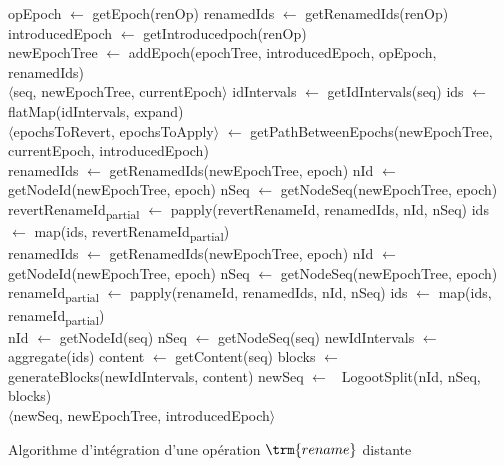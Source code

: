\begin{algorithm}[!ht]
  \footnotesize
  \begin{algorithmic}[5]
          \State opEpoch $\gets$ getEpoch(renOp)
          \State renamedIds $\gets$ getRenamedIds(renOp)
          \State introducedEpoch $\gets$ getIntroducedpoch(renOp)
          \\
          \State newEpochTree $\gets$ addEpoch(epochTree, introducedEpoch, opEpoch, renamedIds) \label{alg:renameRemote-addEpoch}
          \\
            \State \Return $\langle$seq, newEpochTree, currentEpoch$\rangle$ \label{alg:renameRemote-return-1}
          \Else
            \State idIntervals $\gets$ getIdIntervals(seq) \label{alg:renameRemote-getIdIntervals}
            \State ids $\gets$ flatMap(idIntervals, expand) \label{alg:renameRemote-getIds}
            \\
            \State $\langle$epochsToRevert, epochsToApply$\rangle$ $\gets$ getPathBetweenEpochs(newEpochTree, currentEpoch, introducedEpoch) \label{alg:renameRemote-get-path}
            \\
             \label{alg:renameRemote-rename-1}
              \State renamedIds $\gets$ getRenamedIds(newEpochTree, epoch)
              \State nId $\gets$ getNodeId(newEpochTree, epoch)
              \State nSeq $\gets$ getNodeSeq(newEpochTree, epoch)
              \State revertRenameId\textsubscript{partial} $\gets$ papply(revertRenameId, renamedIds, nId, nSeq)
              \State ids $\gets$ map(ids, revertRenameId\textsubscript{partial})
            \EndFor
            \\
              \State renamedIds $\gets$ getRenamedIds(newEpochTree, epoch)
              \State nId $\gets$ getNodeId(newEpochTree, epoch)
              \State nSeq $\gets$ getNodeSeq(newEpochTree, epoch)
              \State renameId\textsubscript{partial} $\gets$ papply(renameId, renamedIds, nId, nSeq)
              \State ids $\gets$ map(ids, renameId\textsubscript{partial})
            \EndFor \label{alg:renameRemote-rename-2}
            \\
            \State nId $\gets$ getNodeId(seq)
            \State nSeq $\gets$ getNodeSeq(seq)
            \State newIdIntervals $\gets$ aggregate(ids)
            \State content $\gets$ getContent(seq)
            \State blocks $\gets$ generateBlocks(newIdIntervals, content)
            \State newSeq $\gets$ \new~LogootSplit(nId, nSeq, blocks) \label{alg:renameRemote-newSeq}
            \\
            \State \Return $\langle$newSeq, newEpochTree, introducedEpoch$\rangle$ \label{alg:renameRemote-return-2}
        \EndIf
      \EndFunction
  \end{algorithmic}
  \caption{Algorithme d'intégration d'une opération $\trm{rename}$ distante}
  \label{alg:renameRemote}
\end{algorithm}

